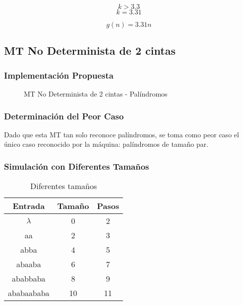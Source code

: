 \documentclass{uc3mpracticas}
\begin{document}
  $$ k > 3.3 $$
  $$ k = 3.31 $$

  $$ g(n) = 3.31n $$


  \subsection{MT No Determinista de 2 cintas}

  \subsubsection{Implementación Propuesta}

  \begin{figure}[!h]
    \caption{MT No Determinista de 2 cintas - Palíndromos}
  \end{figure}


  \subsubsection{Determinación del Peor Caso}

  Dado que esta MT tan solo reconoce palíndromos, se toma como peor caso el único caso reconocido por la máquina: palíndromos de tamaño par.

  \subsubsection{Simulación con Diferentes Tamaños}

  \begin{table}[!h]
    \centering
  \begin{tabular}{|c|c|c|}
  \hline

  \textbf{Entrada} & \textbf{Tamaño} & \textbf{Pasos} \\ \hline

  $\lambda$           & 0               & 2              \\ \hline
  aa               & 2               & 3              \\ \hline
  abba             & 4               & 5              \\ \hline
  abaaba           & 6               & 7              \\ \hline
  ababbaba         & 8               & 9              \\ \hline
  ababaababa       & 10              & 11             \\ \hline
  \end{tabular}
  \caption{Diferentes tamaños}
  \end{table}
\end{document}
